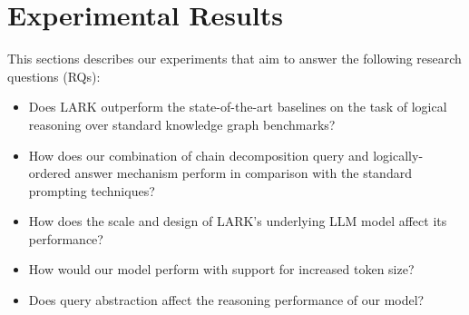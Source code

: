\documentclass{article} %
\newcommand{\model}{LARK}
\begin{document}
\section{Experimental Results}
\label{sec:experiments}
This sections describes our experiments that aim to answer the following research questions (RQs):
\begin{itemize}[noitemsep]
    \item[\textbf{RQ1.}] Does {\model} outperform the state-of-the-art baselines on the task of logical reasoning over standard knowledge graph benchmarks?
    \item[\textbf{RQ2.}] How does our combination of chain decomposition query and logically-ordered answer mechanism perform in comparison with the standard prompting techniques?
    \item[\textbf{RQ3.}] How does the scale and design of {\model}'s underlying LLM model affect its performance? 
    \item[\textbf{RQ4.}] How would our model perform with support for increased token size?
    \item[\textbf{RQ5.}] Does query abstraction affect the reasoning performance of our model?
\end{itemize}
\end{document}
